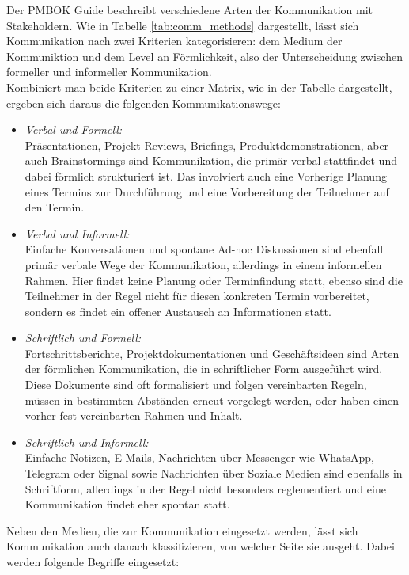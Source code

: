 \documentclass[ThesisDJ.tex]{subfiles}
\begin{document}
Der PMBOK Guide \cite[S.~108]{PMI2017PMBOK} beschreibt verschiedene Arten der Kommunikation mit Stakeholdern. Wie in Tabelle \ref{tab:comm_methods} dargestellt, lässt sich Kommunikation nach zwei Kriterien kategorisieren: dem Medium der Kommuniktion und dem Level an Förmlichkeit, also der Unterscheidung zwischen formeller und informeller Kommunikation.\\
Kombiniert man beide Kriterien zu einer Matrix, wie in der Tabelle dargestellt, ergeben sich daraus die folgenden Kommunikationswege:
\begin{itemize}
	\item \emph{Verbal und Formell:}\\
	Präsentationen, Projekt-Reviews, Briefings, Produktdemonstrationen, aber auch Brainstormings sind Kommunikation, die primär verbal stattfindet und dabei förmlich strukturiert ist. Das involviert auch eine Vorherige Planung eines Termins zur Durchführung und eine Vorbereitung der Teilnehmer auf den Termin.
	\item \emph{Verbal und Informell:}\\
	Einfache Konversationen und spontane Ad-hoc Diskussionen sind ebenfall primär verbale Wege der Kommunikation, allerdings in einem informellen Rahmen. Hier findet keine Planung oder Terminfindung statt, ebenso sind die Teilnehmer in der Regel nicht für diesen konkreten Termin vorbereitet, sondern es findet ein offener Austausch an Informationen statt.
	\item \emph{Schriftlich und Formell:}\\
	Fortschrittsberichte, Projektdokumentationen und Geschäftsideen sind Arten der förmlichen Kommunikation, die in schriftlicher Form ausgeführt wird. Diese Dokumente sind oft formalisiert und folgen vereinbarten Regeln, müssen in bestimmten Abständen erneut vorgelegt werden, oder haben einen vorher fest vereinbarten Rahmen und Inhalt.
	\item \emph{Schriftlich und Informell:}\\
	Einfache Notizen, E-Mails, Nachrichten über Messenger wie WhatsApp, Telegram oder Signal sowie Nachrichten über Soziale Medien sind ebenfalls in Schriftform, allerdings in der Regel nicht besonders reglementiert und eine Kommunikation findet eher spontan statt. 
\end{itemize}
Neben den Medien, die zur Kommunikation eingesetzt werden, lässt sich Kommunikation auch danach klassifizieren, von welcher Seite sie ausgeht. Dabei werden folgende Begriffe eingesetzt:
\end{document}
